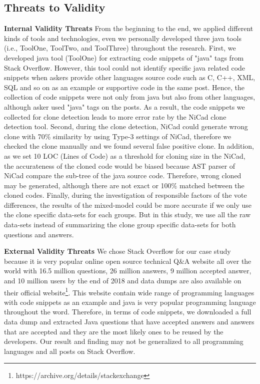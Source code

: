\documentclass[conference]{IEEEtran}
\begin{document}
\subsection{Threats to Validity}\label{TTV}
\textbf{Internal Validity Threats} From the beginning to the end, we applied different kinds of tools and technologies, even we personally developed three java tools (i.e., ToolOne, ToolTwo, and ToolThree) throughout the research. First, we developed java tool (ToolOne) for extracting code snippets of "java" tags from Stack Overflow. However, this tool could not identify specific java  related code snippets when askers provide other languages source code such as C, C++, XML, SQL and so on as an example or supportive code in the same post. Hence, the collection of code snippets were not only from java but also from other languages, although asker used "java" tags on the posts.  As a result, the code snippets we collected for clone detection leads to more error rate by the NiCad clone detection tool. Second, during the clone detection, NiCad could generate wrong clone with 70\% similarity by using Type-3 settings of NiCad, therefore we checked the clone manually and we found several false positive clone. In addition, as we set 10 LOC (Lines of Code) as a threshold for cloning size in the NiCad,  the accurateness of the cloned code would be biased because AST parser of NiCad compare the sub-tree of the java source code. Therefore, wrong cloned may be generated, although there are not exact or 100\% matched between the cloned codes. Finally, during the investigation of responsible factors of the vote differences, the results of the mixed-model could be more accurate if we only use the clone specific data-sets for each groups. But in this study, we use all the raw data-sets instead of summarizing the clone group specific data-sets for both questions and answers.\newline

\textbf{External Validity Threats} We chose Stack Overflow for our case study because it is very popular online open source technical Q\&A website all over the world with 16.5 million questions, 26 million answers, 9 million accepted answer, and 10 million users by the end of 2018 and data dumps are also available on their official website\footnote{https://archive.org/details/stackexchange}. This website contain wide range of programming languages with code snippets as an example and java is very popular programming language throughout the word. Therefore, in terms of code snippets, we downloaded a full data dump and extracted Java questions that have accepted answers and answers that are accepted and they are the most likely ones to be reused by the developers. Our result and finding may not be generalized to all programming languages and all posts on Stack Overflow.
\end{document}
